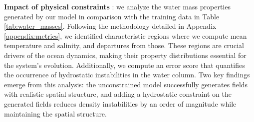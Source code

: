 \documentclass{article}
\begin{document}
\begin{table}[h]
\centering


\caption{Statistical analysis of water mass properties and density stability.
Values are presented as mean $\pm\  \sigma$.
The first four columns show salinity and temperature averages in bottom and deep water masses (defined in \ref{appendix:metrics}).
The rightmost column show the percentage of ocean volume where static instability occurs (where denser water is above lighter water).}
\label{tab:water_masses}
\end{table}

\textbf{Impact of physical constraints} : we analyze the water mass properties generated by our model in comparison with the training data in Table \ref{tab:water_masses}. Following the methodology detailed in Appendix \ref{appendix:metrics}, we identified characteristic regions where we compute mean temperature and salinity, and departures from those. These regions are crucial drivers of the ocean dynamics, making their property distributions essential for the system's evolution. Additionally, we compute an error score that quantifies the occurrence of hydrostatic instabilities in the water column. Two key findings emerge from this analysis: the unconstrained model successfully generates fields with realistic spatial structure, and adding a hydrostatic constraint on the generated fields reduces density instabilities by an order of magnitude while maintaining the spatial structure.
\end{document}
